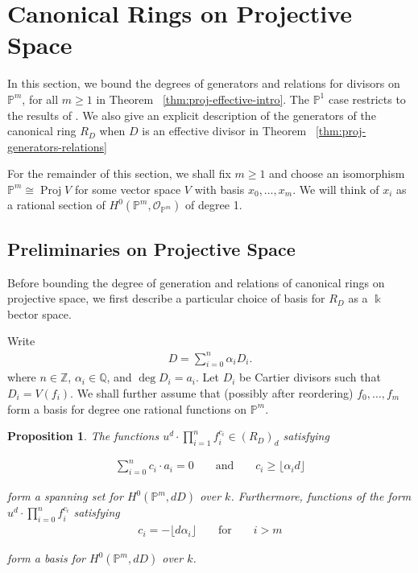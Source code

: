 \documentclass{amsart}
\theoremstyle{plain}
\newtheorem{prop}[thm]{Proposition}
\theoremstyle{definition}
\theoremstyle{remark}
\numberwithin{equation}{section}
\newcommand\ssec{\subsection}
\newcommand\bq{{\mathbb Q}}
\newcommand\bp{{\mathbb P}}
\newcommand\bz{{\mathbb Z}}
\newcommand\bk{{\Bbbk}}
\newcommand\sco{{\mathscr O}}
\newcommand\bida{a}
\DeclareMathOperator{\proj}{Proj}
\begin{document}
\section{Canonical Rings on Projective Space}
\label{sec:proj}
In this section, we bound the degrees of generators and relations for divisors
on $\bp^m$, for all $m \geq 1$ in Theorem ~\ref{thm:proj-effective-intro}. 
The $\bp^1$ case restricts to the results of
\cite{dorney:canonical}. We also give an explicit description of the
generators of the canonical ring $R_D$ when $D$ is an effective divisor in Theorem ~\ref{thm:proj-generators-relations}


For the remainder of this section, we shall fix $m \geq 1$ and choose an
isomorphism $\bp^m \cong \proj V$ for some vector space $V$ with basis $x_0,\ldots, x_m$.  We will think of $x_i$ as a rational section of $H^0(\bp^m,
\sco_{\bp^m})$ of degree 1.

\ssec{Preliminaries on Projective Space}
Before bounding the degree of generation and relations of
canonical rings on projective space, we first
describe a particular choice of basis for $R_D$ as a $\bk$ bector space.

Write
\begin{align*}
	D = \sum_{i=0}^{n}\alpha_i D_i.
\end{align*}
where $n \in \bz$, $\alpha_i \in \bq$, and $\deg D_i = \bida_i$. Let $D_i$ be
Cartier divisors such that $D_i = V(f_i)$.
We shall further assume that (possibly after reordering) $f_0,\ldots, f_{m}$ form a
basis for degree one rational functions on $\bp^m$.

\begin{prop}
\label{prop:pm-span-and-basis}
The functions $u^d \cdot \prod_{i=1}^n f_i^{c_i} \in (R_D)_d$ satisfying

\begin{align}
\label{align:pm-span}
\sum_{i=0}^{n} c_i \cdot \bida_i = 0 && \text{ and } &&c_i \geq \lfloor \alpha_i d\rfloor	
\end{align}

\noindent
form a spanning set for $H^0(\bp^m, dD)$ over $k$. Furthermore, functions 
of the form $u^d \cdot \prod_{i=0}^n f_i^{c_i}$ satisfying
\begin{align}
\label{align:pm-basis}
c_i = -\lfloor d\alpha_i \rfloor && \text{ for } && i > m
\end{align}

\noindent
form a basis for $H^0(\bp^m, dD)$ over $k$.
\end{prop}
\end{document}
